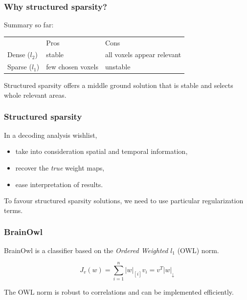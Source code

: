 \documentclass[11pt]{beamer}
\begin{document}
\begin{frame}
    \frametitle{Why structured sparsity?}

    Summary so far:

    \begin{center}
        \begin{tabular}[h]{@{}lll@{}}
            & Pros & Cons \\
            \cmidrule(r){2-3}
            Dense ($l_2$) & stable & all voxels appear relevant \\
            Sparse ($l_1$) & few chosen voxels & unstable
        \end{tabular}
    \end{center} 
    
    \pause

    Structured sparsity offers a middle ground solution that is stable and
    selects whole relevant areas.

\end{frame}

\begin{frame}
    \frametitle{Structured sparsity}
    In a decoding analysis wishlist,
    \begin{itemize}
        \item take into consideration spatial and temporal information, \pause
        \item recover the \emph{true} weight maps, \pause
        \item ease interpretation of results. \pause
    \end{itemize}

    To favour structured sparsity solutions, we need to use particular
    regularization terms.

\end{frame}

\begin{frame}
    \frametitle{BrainOwl}
    BrainOwl is a classifier based on the \emph{Ordered Weighted} $l_1$
    (OWL) norm.

    \[J_v(w) = \sum_{i=1}^{n} |w|_{[i]} v_i = v^T |w|_{\downarrow}\]

    The OWL norm is robust to correlations and can be implemented efficiently.

\end{frame}
\end{document}
